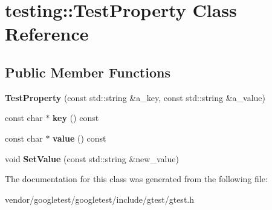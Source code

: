 \hypertarget{classtesting_1_1_test_property}{}\section{testing\+:\+:Test\+Property Class Reference}
\label{classtesting_1_1_test_property}
\subsection*{Public Member Functions}
\begin{DoxyCompactItemize}
\item 
\mbox{\label{classtesting_1_1_test_property_a25a0ccf1c75a92af46a48d3c2a873e6d}} 
{\bfseries Test\+Property} (const std\+::string \&a\+\_\+key, const std\+::string \&a\+\_\+value)
\item 
\mbox{\label{classtesting_1_1_test_property_ad60435d4ad04ac030487d8998fc61c5f}} 
const char $\ast$ {\bfseries key} () const
\item 
\mbox{\label{classtesting_1_1_test_property_ad423a07af33c88b0c9ed33ee74815a63}} 
const char $\ast$ {\bfseries value} () const
\item 
\mbox{\label{classtesting_1_1_test_property_a377245335d9f614cd06d1650e3358e1d}} 
void {\bfseries Set\+Value} (const std\+::string \&new\+\_\+value)
\end{DoxyCompactItemize}


The documentation for this class was generated from the following file\+:\begin{DoxyCompactItemize}
\item 
vendor/googletest/googletest/include/gtest/gtest.\+h\end{DoxyCompactItemize}
